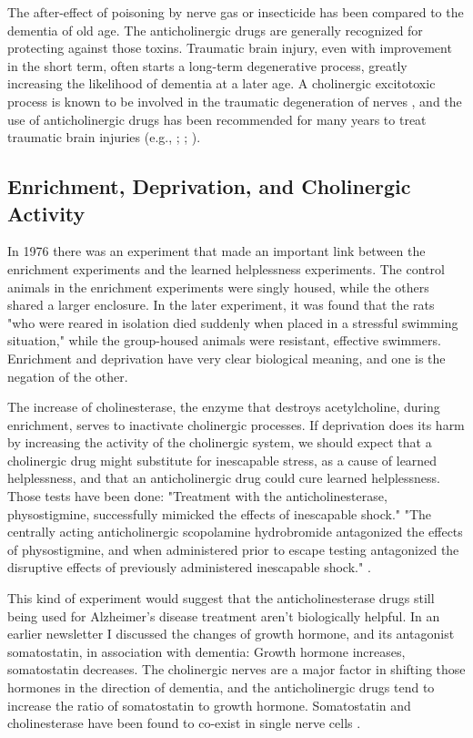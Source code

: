 \documentclass{article}
\begin{document}
The after-effect of poisoning by nerve gas or insecticide has been compared to the dementia of old age. The anticholinergic drugs are generally recognized for protecting against those toxins. Traumatic brain injury, even with improvement in the short term, often starts a long-term degenerative process, greatly increasing the likelihood of dementia at a later age. A cholinergic excitotoxic process is known to be involved in the traumatic degeneration of nerves \cite{Lyeth1992}, and the use of anticholinergic drugs has been recommended for many years to treat traumatic brain injuries (e.g., \cite{Ward1950}; \cite{Ruge1954}; \cite{Hayes1986}).

\subsection{Enrichment, Deprivation, and Cholinergic Activity}
In 1976 there was an experiment \cite{Rosellini1976} that made an important link between the enrichment experiments and the learned helplessness experiments. The control animals in the enrichment experiments were singly housed, while the others shared a larger enclosure. In the later experiment, it was found that the rats "who were reared in isolation died suddenly when placed in a stressful swimming situation," while the group-housed animals were resistant, effective swimmers. Enrichment and deprivation have very clear biological meaning, and one is the negation of the other.

The increase of cholinesterase, the enzyme that destroys acetylcholine, during enrichment, serves to inactivate cholinergic processes. If deprivation does its harm by increasing the activity of the cholinergic system, we should expect that a cholinergic drug might substitute for inescapable stress, as a cause of learned helplessness, and that an anticholinergic drug could cure learned helplessness. Those tests have been done: "Treatment with the anticholinesterase, physostigmine, successfully mimicked the effects of inescapable shock." "The centrally acting anticholinergic scopolamine hydrobromide antagonized the effects of physostigmine, and when administered prior to escape testing antagonized the disruptive effects of previously administered inescapable shock." \cite{Anisman1981}.

This kind of experiment would suggest that the anticholinesterase drugs still being used for Alzheimer's disease treatment aren't biologically helpful. In an earlier newsletter I discussed the changes of growth hormone, and its antagonist somatostatin, in association with dementia: Growth hormone increases, somatostatin decreases. The cholinergic nerves are a major factor in shifting those hormones in the direction of dementia, and the anticholinergic drugs tend to increase the ratio of somatostatin to growth hormone. Somatostatin and cholinesterase have been found to co-exist in single nerve cells \cite{Delfs1984}.
\end{document}
